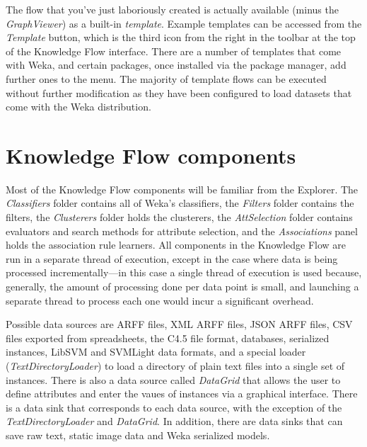 The flow that you've just laboriously created is actually available
(minus the \textit{GraphViewer}) as a
built-in \textit{template}. Example templates can be accessed from the
\textit{Template} button, which is the third icon from the right in the toolbar
at the top of the Knowledge Flow interface. There are a number of
templates that come with Weka, and certain packages, once installed
via the package manager, add further ones to the menu. The majority of
template flows can be executed without further modification as they
have been configured to load datasets that come with the Weka
distribution.

\section{Knowledge Flow components}

Most of the Knowledge Flow components will be familiar from the
Explorer. The \textit{Classifiers} folder contains all of Weka's
classifiers, the \textit{Filters} folder contains the filters,
the \textit{Clusterers} folder holds the clusterers,
the \textit{AttSelection} folder contains evaluators and search
methods for attribute selection, and the \textit{Associations} panel
holds the association rule learners. All components in the Knowledge
Flow are run in a separate thread of execution, except in the case
where data is being processed incrementally---in this case a single
thread of execution is used because, generally, the amount of
processing done per data point is small, and launching a separate
thread to process each one would incur a significant overhead.

Possible data sources are ARFF files, XML ARFF files, JSON ARFF files,
CSV files exported from spreadsheets, the C4.5 file format, databases,
serialized instances, LibSVM and SVMLight data formats, and a special
loader (\textit{TextDirectoryLoader}) to load a directory of plain
text files into a single set of instances. There is also a data source
called
\textit{DataGrid} that allows the user to define attributes and enter the vaues
of instances via a graphical interface. There is a data sink that
corresponds to each data source, with the exception of the
\textit{TextDirectoryLoader} and \textit{DataGrid}. In addition, there are data sinks
that can save raw text, static image data and Weka serialized models.

